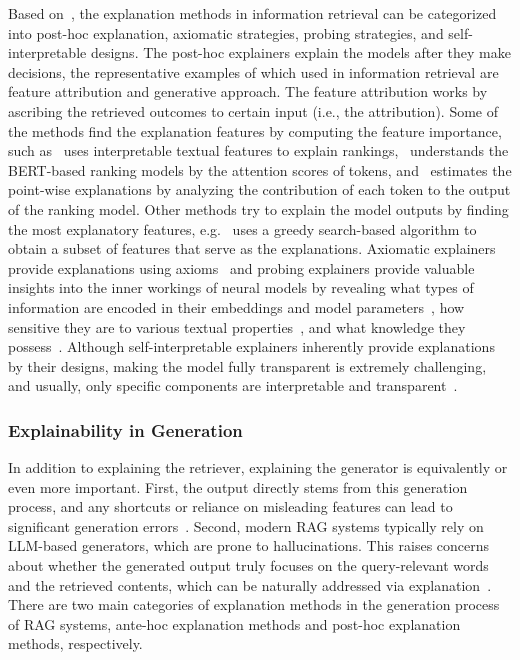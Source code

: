 Based on~\cite{anand2023explainable}, the explanation methods in information retrieval can be categorized into post-hoc explanation, axiomatic strategies, probing strategies, and self-interpretable designs. The post-hoc explainers explain the models after they make decisions, the representative examples of which used in information retrieval are feature attribution and generative approach. The feature attribution works by ascribing the retrieved outcomes to certain input (i.e., the attribution). Some of the methods find the explanation features by computing the feature importance, such as~\cite{qiao2019understanding} uses interpretable textual features to explain rankings,~\cite{polley2022towards} understands the BERT-based ranking models by the attention scores of tokens, and~\cite{verma2019lirme} estimates the point-wise explanations by analyzing the contribution of each token to the output of the ranking model. Other methods try to explain the model outputs by finding the most explanatory features, e.g.~\cite{singh2021extracting} uses a greedy search-based algorithm to obtain a subset of features that serve as the explanations. Axiomatic explainers provide explanations using axioms~\cite{volske2021towards} and probing explainers provide valuable insights into the inner workings of neural models by revealing what types of information are encoded in their embeddings and model parameters~\cite{cohen2018understanding}, how sensitive they are to various textual properties~\cite{macavaney2022abnirml}, and what knowledge they possess~\cite{choi2022finding,formal2021white}. Although self-interpretable explainers inherently provide explanations by their designs, making the model fully transparent is extremely challenging, and usually, only specific components are interpretable and transparent~\cite{formal2021white,zhang2021explain}. 

\subsubsection{Explainability in Generation}
In addition to explaining the retriever, explaining the generator is equivalently or even more important. First, the output directly stems from this generation process, and any shortcuts or reliance on misleading features can lead to significant generation errors~\cite{hong2023so, deng2024cram}. Second, modern RAG systems typically rely on LLM-based generators, which are prone to hallucinations. This raises concerns about whether the generated output truly focuses on the query-relevant words and the retrieved contents, which can be naturally addressed via explanation~\cite{schneider2024explainable, sudhi2024rag}. There are two main categories of explanation methods in the generation process of RAG systems, ante-hoc explanation methods and post-hoc explanation methods, respectively. 

